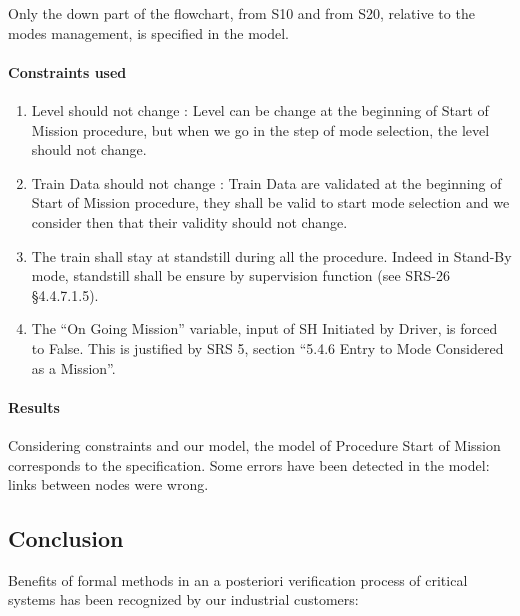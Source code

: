 Only the down part of the flowchart, from S10 and from S20, relative to the modes management, is specified in the \SCADE{} model.





\paragraph{Constraints used}
\begin{enumerate}
\item Level should not change : Level can be change at the beginning of Start of Mission procedure, but when we go in the step of mode selection, the level should not change.

\item Train Data should not change : Train Data are validated at the beginning of Start of Mission procedure, they shall be valid to start mode selection and we consider then that  their validity should not change.

\item The train shall stay at standstill during all the procedure. Indeed in Stand-By mode, standstill shall be ensure by supervision function (see SRS-26 §4.4.7.1.5).

\item The ``On Going Mission'' variable, input of SH Initiated by Driver, is
forced to False. This is justified by SRS 5, section ``5.4.6 Entry to
Mode Considered as a Mission''.
\end{enumerate}



\paragraph{Results}
Considering constraints and our \HLL{} model, the \SCADE{} model of Procedure
Start of Mission corresponds to the specification.
Some errors have been detected in the \SCADE{} model: links between nodes were wrong.


\subsection{Conclusion}




Benefits of formal  methods in an a posteriori verification process of critical systems has been recognized by our industrial customers:

